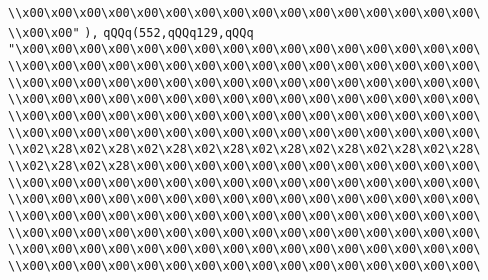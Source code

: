 \verb|\\x00\x00\x00\x00\x00\x00\x00\x00\x00\x00\x00\x00\x00\x00\x00\x00\|\newline
\verb|\\x00\x00"|\newline
\verb|),|\newline
\verb|qQQq(552,qQQq129,qQQq|\newline
\verb|"\x00\x00\x00\x00\x00\x00\x00\x00\x00\x00\x00\x00\x00\x00\x00\x00\|\newline
\verb|\\x00\x00\x00\x00\x00\x00\x00\x00\x00\x00\x00\x00\x00\x00\x00\x00\|\newline
\verb|\\x00\x00\x00\x00\x00\x00\x00\x00\x00\x00\x00\x00\x00\x00\x00\x00\|\newline
\verb|\\x00\x00\x00\x00\x00\x00\x00\x00\x00\x00\x00\x00\x00\x00\x00\x00\|\newline
\verb|\\x00\x00\x00\x00\x00\x00\x00\x00\x00\x00\x00\x00\x00\x00\x00\x00\|\newline
\verb|\\x00\x00\x00\x00\x00\x00\x00\x00\x00\x00\x00\x00\x00\x00\x00\x00\|\newline
\verb|\\x02\x28\x02\x28\x02\x28\x02\x28\x02\x28\x02\x28\x02\x28\x02\x28\|\newline
\verb|\\x02\x28\x02\x28\x00\x00\x00\x00\x00\x00\x00\x00\x00\x00\x00\x00\|\newline
\verb|\\x00\x00\x00\x00\x00\x00\x00\x00\x00\x00\x00\x00\x00\x00\x00\x00\|\newline
\verb|\\x00\x00\x00\x00\x00\x00\x00\x00\x00\x00\x00\x00\x00\x00\x00\x00\|\newline
\verb|\\x00\x00\x00\x00\x00\x00\x00\x00\x00\x00\x00\x00\x00\x00\x00\x00\|\newline
\verb|\\x00\x00\x00\x00\x00\x00\x00\x00\x00\x00\x00\x00\x00\x00\x00\x00\|\newline
\verb|\\x00\x00\x00\x00\x00\x00\x00\x00\x00\x00\x00\x00\x00\x00\x00\x00\|\newline
\verb|\\x00\x00\x00\x00\x00\x00\x00\x00\x00\x00\x00\x00\x00\x00\x00\x00\|\newline

